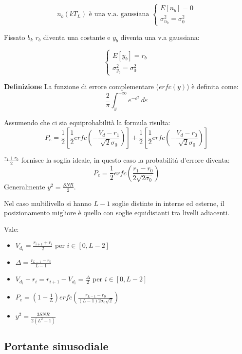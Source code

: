 \documentclass{article}
\newcommand{\df}{\noindent\textbf{Definizione} }
\begin{document}
\[n_b(kT_L)\text{ è una v.a. gaussiana }\begin{cases}
    E[n_b]=0\\
    \sigma_{n_b}^2=\sigma_0^2
\end{cases}\]

\noindent Fissato $b_k$ $r_b$ diventa una costante e $y_b$ diventa una v.a gaussiana:

\[\begin{cases}
    E[y_b]=r_b\\
    \sigma_{y_b}^2=\sigma_0^2
\end{cases}\]\newline

\df La funzione di errore complementare ($erfc(y)$) è definita come:
$$\frac{2}{\pi}\int_y^{+\infty}e^{-\varepsilon^2}\ d\varepsilon$$\newline

\noindent Assumendo che ci sia equiprobabilità la formula risulta:
$$P_e=\frac{1}{2}\left[\frac{1}{2}erfc(-\frac{V_d-r_1}{\sqrt{2}\sigma_0})\right]+\frac{1}{2}\left[\frac{1}{2}erfc(-\frac{V_d-r_0}{\sqrt{2}\sigma_0})\right]$$\newline

\noindent $\displaystyle\frac{r_1+r_0}{2}$ fornisce la soglia ideale, in questo caso la probabilità d'errore diventa:
$$P_e=\frac{1}{2}erfc(\frac{r_1-r_0}{2\sqrt{2\sigma_0}})$$
\noindent Generalmente $y^2=\frac{SNR}{2}$.\newline

\noindent Nel caso multilivello si hanno $L-1$ soglie distinte in interne ed esterne, il posizionamento migliore è quello con soglie equidistanti tra livelli adiacenti.\newline

\noindent Vale:
\begin{itemize}
    \item $\displaystyle V_{d_i}=\frac{r_{i+1}+r_i}{2}$ per $i\in[0,L-2]$
    \item $\displaystyle\Delta=\frac{r_{L-1}-r_0}{L-1}$
    \item $\displaystyle V_{d_i}-r_i=r_{i+1}-V_{d_i}=\frac{\Delta}{2}$ per $i\in[0,L-2]$
    \item $\displaystyle P_e=(1-\frac{1}{L})erfc\left(\frac{r_{L-1}-r_0}{(L-1)2\sigma_0\sqrt{2}}\right)$
    \item $\displaystyle y^2=\frac{3SNR}{2(L^2-1)}$
\end{itemize}

\newpage

\subsection{Portante sinusodiale}
\end{document}
